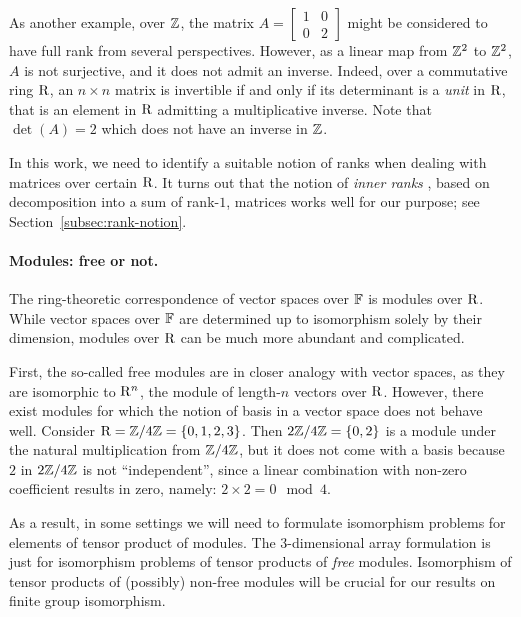 As another example, over $\mathbb{Z}$, the matrix $A=\begin{bmatrix}
	1 & 0 \\
	0 & 2
\end{bmatrix}$ might be considered to have full rank from several perspectives. However, as a linear map from $\mathbb{Z}^2$ to $\mathbb{Z}^2$, $A$ is not surjective, and it does not admit an inverse. Indeed, over a commutative ring $\mathrm{R}$, an $n\times n$ matrix is invertible if and only if its determinant is a \emph{unit} in $\mathrm{R}$, that is an element in $\mathrm{R}$ admitting a multiplicative inverse. Note that $\det(A)=2$ which does not have an inverse in $\mathbb{Z}$.

In this work, we need to identify a suitable notion of ranks when dealing with matrices over certain $\mathrm{R}$. It turns out that the notion of \emph{inner ranks} \cite{Coh85}, based on decomposition into a sum of rank-$1$, matrices works well for our purpose; see Section~\ref{subsec:rank-notion}.

\paragraph{Modules: free or not.} The ring-theoretic correspondence of vector spaces over $\mathbb{F}$ is modules over $\mathrm{R}$. While vector spaces over $\mathbb{F}$ are determined up to isomorphism solely by their dimension, modules over $\mathrm{R}$ can be much more abundant and complicated. 

First, the so-called free modules are in closer analogy with vector spaces, as they are isomorphic to $\mathrm{R}^n$, the module of length-$n$ vectors over $\mathrm{R}$. However, there exist modules for which the notion of basis in a vector space does not behave well. Consider $\mathrm{R}=\mathbb{Z}/4\mathbb{Z}=\{0, 1, 2, 3\}$. Then $2\mathbb{Z}/4\mathbb{Z}=\{0, 2\}$ is a module under the natural multiplication from $\mathbb{Z}/4\mathbb{Z}$, but it does not come with a basis because $2$ in $2\mathbb{Z}/4\mathbb{Z}$ is not ``independent'', since a linear combination with non-zero coefficient results in zero, namely: $2\times 2=0\mod 4$. 

As a result, in some settings we will need to formulate isomorphism problems for elements of tensor product of modules. The $3$-dimensional array formulation is just for isomorphism problems of tensor products of \emph{free} modules. Isomorphism of tensor products of (possibly) non-free modules will be crucial for our results on finite group isomorphism.

